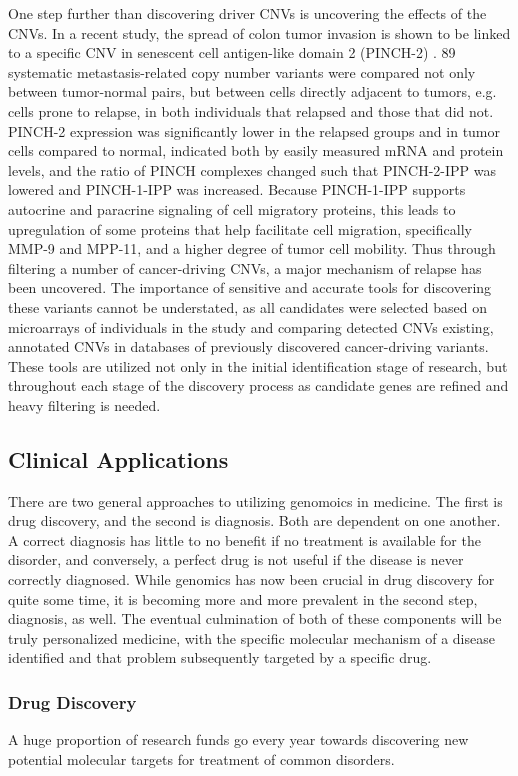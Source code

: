 \documentclass{easychithesis}
\begin{document}
One step further than discovering driver CNVs is uncovering the effects of the CNVs. In a recent study, the spread of colon tumor invasion is shown to be linked to a specific CNV in senescent cell antigen-like domain 2 (PINCH-2) \cite{park2014pinch}. 89 systematic metastasis-related copy number variants were compared not only between tumor-normal pairs, but between cells directly adjacent to tumors, e.g. cells prone to relapse, in both individuals that relapsed and those that did not. PINCH-2 expression was significantly lower in the relapsed groups and in tumor cells compared to normal, indicated both by easily measured mRNA and protein levels, and the ratio of PINCH complexes changed such that PINCH-2-IPP was lowered and PINCH-1-IPP was increased. Because PINCH-1-IPP supports autocrine and paracrine signaling of cell migratory proteins, this leads to upregulation of some proteins that help facilitate cell migration, specifically MMP-9 and MPP-11, and a higher degree of tumor cell mobility. Thus through filtering a number of cancer-driving CNVs, a major mechanism of relapse has been uncovered. The importance of sensitive and accurate tools for discovering these variants cannot be understated, as all candidates were selected based on microarrays of individuals in the study and comparing detected CNVs existing, annotated CNVs in databases of previously discovered cancer-driving variants.  These tools are utilized not only in the initial identification stage of research, but throughout each stage of the discovery process as candidate genes are refined and heavy filtering is needed.

\subsection{Clinical Applications}
There are two general approaches to utilizing genomoics in medicine. The first is drug discovery, and the second is diagnosis. Both are dependent on one another. A correct diagnosis has little to no benefit if no treatment is available for the disorder, and conversely, a perfect drug is not useful if the disease is never correctly diagnosed. While genomics has now been crucial in drug discovery for quite some time, it is becoming more and more prevalent in the second step, diagnosis, as well. The eventual culmination of both of these components will be truly personalized medicine, with the specific molecular mechanism of a disease identified and that problem subsequently targeted by a specific drug.

\subsubsection{Drug Discovery}
A huge proportion of research funds go every year towards discovering new potential molecular targets for treatment of common disorders. 
\end{document}
